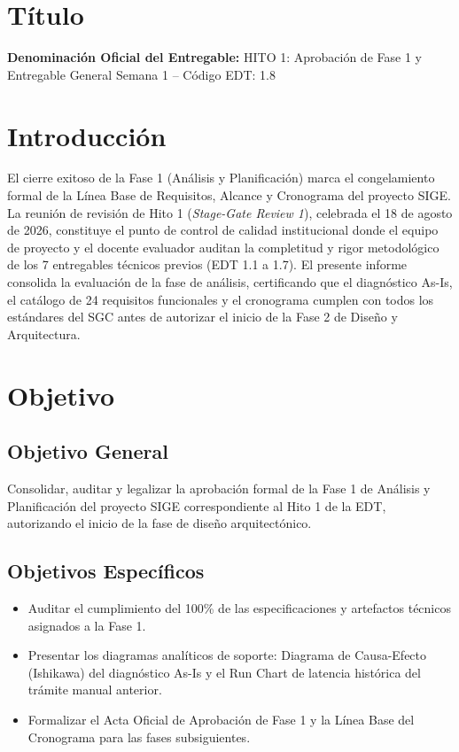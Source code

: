 \documentclass[12pt,a4paper]{article}
\begin{document}
\section{Título}
\textbf{Denominación Oficial del Entregable:} HITO 1: Aprobación de Fase 1 y Entregable General Semana 1 -- Código EDT: 1.8

\section{Introducción}
El cierre exitoso de la Fase 1 (Análisis y Planificación) marca el congelamiento formal de la Línea Base de Requisitos, Alcance y Cronograma del proyecto SIGE. La reunión de revisión de Hito 1 (\textit{Stage-Gate Review 1}), celebrada el 18 de agosto de 2026, constituye el punto de control de calidad institucional donde el equipo de proyecto y el docente evaluador auditan la completitud y rigor metodológico de los 7 entregables técnicos previos (EDT 1.1 a 1.7). El presente informe consolida la evaluación de la fase de análisis, certificando que el diagnóstico As-Is, el catálogo de 24 requisitos funcionales y el cronograma cumplen con todos los estándares del SGC antes de autorizar el inicio de la Fase 2 de Diseño y Arquitectura.

\section{Objetivo}
\subsection{Objetivo General}
Consolidar, auditar y legalizar la aprobación formal de la Fase 1 de Análisis y Planificación del proyecto SIGE correspondiente al Hito 1 de la EDT, autorizando el inicio de la fase de diseño arquitectónico.
\subsection{Objetivos Específicos}
\begin{itemize}[leftmargin=1.5em, itemsep=2pt]
    \item Auditar el cumplimiento del 100\% de las especificaciones y artefactos técnicos asignados a la Fase 1.
    \item Presentar los diagramas analíticos de soporte: Diagrama de Causa-Efecto (Ishikawa) del diagnóstico As-Is y el Run Chart de latencia histórica del trámite manual anterior.
    \item Formalizar el Acta Oficial de Aprobación de Fase 1 y la Línea Base del Cronograma para las fases subsiguientes.
\end{itemize}
\end{document}
